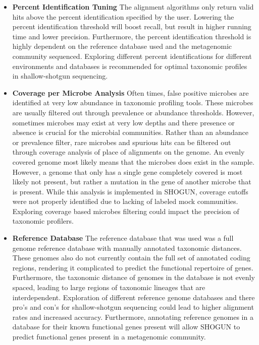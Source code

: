 \begin{itemize}
\item \textbf{Percent Identification Tuning} The alignment algorithms only return valid hits above the percent identification specified by the user. Lowering the percent identification threshold will boost recall, but result in higher running time and lower precision. Furthermore, the percent identification threshold is highly dependent on the reference database used and the metagenomic community sequenced. Exploring different percent identifications for different environments and databases is recommended for optimal taxonomic profiles in shallow-shotgun sequencing.

\item \textbf{Coverage per Microbe Analysis} Often times, false positive microbes are identified at very low abundance in taxonomic profiling tools. These microbes are usually filtered out through prevalence or abundance thresholds. However, sometimes microbes may exist at very low depths and there presence or absence is crucial for the microbial communities. Rather than an abundance or prevalence filter, rare microbes and spurious hits can be filtered out through coverage analysis of place of alignments on the genome. An evenly covered genome most likely means that the microbes does exist in the sample. However, a genome that only has a single gene completely covered is most likely not present, but rather a mutation in the gene of another microbe that is present. While this analysis is implemented in SHOGUN, coverage cutoffs were not properly identified due to lacking of labeled mock communities. Exploring coverage based microbes filtering could impact the precision of taxonomic profilers.

\item \textbf{Reference Database} The reference database that was used was a full genome reference database with manually annotated taxonomic distances. These genomes also do not currently contain the full set of annotated coding regions, rendering it complicated to predict the functional repertoire of genes. Furthermore, the taxonomic distance of genomes in the database is not evenly spaced, leading to large regions of taxonomic lineages that are interdependent. Exploration of different reference genome databases and there pro's and con's for shallow-shotgun sequencing could lead to higher alignment rates and increased accuracy. Furthermore, annotating reference genomes in a database for their known functional genes present will allow SHOGUN to predict functional genes present in a metagenomic community.

\end{itemize}

